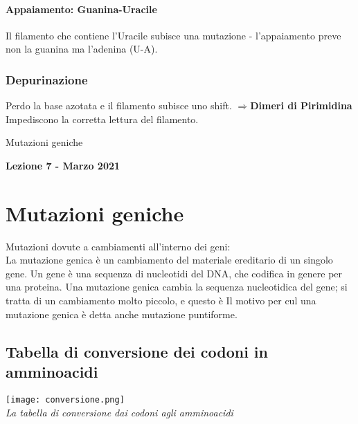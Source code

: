 \documentclass{article}
\begin{document}
\paragraph{Appaiamento: Guanina-Uracile} Il filamento che contiene l'Uracile subisce una mutazione - l'appaiamento preve non la guanina ma l'adenina (U-A).
\subsubsection{Depurinazione}Perdo la base azotata e il filamento subisce uno shift.
$\Rightarrow$\textbf{Dimeri di Pirimidina}\\
Impediscono la corretta lettura del filamento.

\begin{titlepage}
    \begin{center}
        \vspace*{1cm}
        \LARGE
        Mutazioni geniche
            
        \vspace{1.5cm}
        
        \Large
        \textbf{Lezione 7 - Marzo 2021}

        \vspace{0.8cm}

    \end{center}
\end{titlepage}
\setcounter{page}{19}
\section{Mutazioni geniche}
Mutazioni dovute a cambiamenti all'interno dei geni:\\
La mutazione genica è un cambiamento del materiale ereditario di un singolo gene. Un gene è una sequenza di nucleotidi del DNA, che
codifica in genere per una proteina. Una mutazione genica cambia la sequenza nucleotidica del gene; si tratta di un
cambiamento molto piccolo, e questo è Il motivo per cul una mutazione genica è detta anche mutazione puntiforme.
\subsection{Tabella di conversione dei codoni in amminoacidi}
\begin{center}
    \texttt{[image: conversione.png]}\\
    \emph{La tabella di conversione dai codoni agli amminoacidi}
\end{center}
\end{document}
